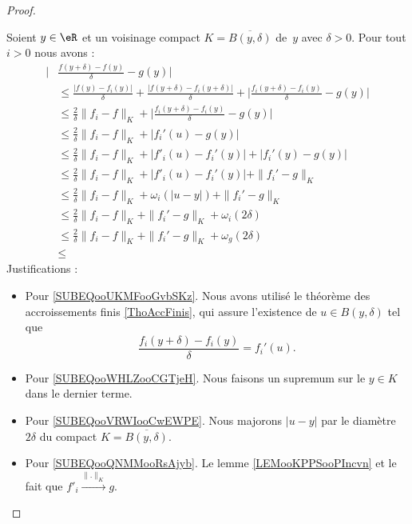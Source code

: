 \begin{proof}
\begin{subproof}
    Soient $y\in \eR$ et un voisinage compact $K=\overline{ B(y,\delta) }$ de~$y$ avec \( \delta>0\). Pour tout \( i>0\) nous avons :
  \begin{subequations}
      \begin{align}
          \Big| &  \frac{ f(y+\delta)-f(y) }{ \delta }  - g(y) \Big|\\
          &\leq   \frac{ | f(y)-f_i(y)|}{ \delta }  +\frac{ | f(y+\delta)-f_i(y+\delta) | }{ \delta }+\big| \frac{ f_i(y+\delta)-f_i(y) }{ \delta }-g(y) \big|\\
          &\leq \frac{ 2 }{ \delta } \|f_i - f\|_K + \big| \frac{ f_i(y+\delta)-f_i(y) }{ \delta }-g(y) \big|\\
          &\leq \frac{ 2 }{ \delta }\| f_i-f \|_K+| f_i'(u)-g(y) |  \label{SUBEQooUKMFooGvbSKz} \\
          &\leq \frac{ 2 }{ \delta }\| f_i-f \|_K+| f'_i(u)-f_i'(y) |+| f_i'(y)-g(y) | \\
          &\leq \frac{ 2 }{ \delta }\| f_i-f \|_K+| f'_i(u)-f_i'(y) |+\| f_i'-g \|_K  \label{SUBEQooWHLZooCGTjeH} \\
          &\leq \frac{ 2 }{ \delta }\| f_i-f \|_K+   \omega_i(| u-y |)    +\| f_i'-g \|_K   \\
          &\leq \frac{ 2 }{ \delta }\| f_i-f \|_K      +\| f_i'-g \|_K + \omega_i(2\delta)    \label{SUBEQooVRWIooCwEWPE}  \\
          &\leq \frac{ 2 }{ \delta }\| f_i-f \|_K      +\| f_i'-g \|_K + \omega_g(2\delta)    \label{SUBEQooQNMMooRsAjyb}  \\
          &\leq 
      \end{align}
  \end{subequations}
  Justifications :
  \begin{itemize}
      \item 
  Pour \ref{SUBEQooUKMFooGvbSKz}. Nous avons utilisé le théorème des accroissements finis \ref{ThoAccFinis}, qui assure l'existence de \( u\in B(y,\delta) \) tel que
  \begin{equation}
      \frac{ f_i(y+\delta)-f_i(y) }{ \delta }=f_i'(u).
  \end{equation}
  \item Pour \ref{SUBEQooWHLZooCGTjeH}. Nous faisons un supremum sur le \( y\in K\) dans le dernier terme.
  \item Pour \ref{SUBEQooVRWIooCwEWPE}. Nous majorons \( | u-y |\) par le diamètre \( 2\delta\) du compact \( K=\overline{ B(y,\delta) }\).
  \item Pour \ref{SUBEQooQNMMooRsAjyb}. Le lemme \ref{LEMooKPPSooPIncvn} et le fait que \(   f'_i\stackrel{\| . \|_K}{\longrightarrow}g \).
  \end{itemize}


\end{subproof}
\end{proof}
